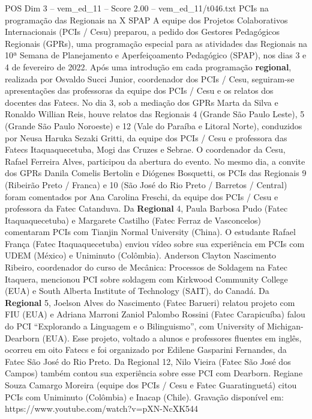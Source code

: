 \begin{textsample}{POS Dim 3 – vem\_ed\_11 – Score 2.00 – vem\_ed\_11/t046.txt}  \label{ex:f3_pos_141}
PCIs na programação das Regionais na X SPAP A equipe dos Projetos Colaborativos Internacionais (PCIs / Cesu) preparou, a pedido dos Gestores Pedagógicos Regionais (GPRs), uma programação especial para as atividades das Regionais na 10ª Semana de Planejamento e Aperfeiçoamento Pedagógico (SPAP), nos dias 3 e 4 de fevereiro de 2022.
Após uma introdução em cada programação \textbf{regional}, realizada por Osvaldo Succi Junior, coordenador dos PCIs / Cesu, seguiram-se apresentações das professoras da equipe dos PCIs / Cesu e os relatos dos docentes das Fatecs.
No dia 3, sob a mediação dos GPRs Marta da Silva e Ronaldo Willian Reis, houve relatos das Regionais 4 (Grande São Paulo Leste), 5 (Grande São Paulo Noroeste) e 12 (Vale do Paraíba e Litoral Norte), conduzidos por Neusa Haruka Sezaki Gritti, da equipe dos PCIs / Cesu e professora das Fatecs Itaquaquecetuba, Mogi das Cruzes e Sebrae.
O coordenador da Cesu, Rafael Ferreira Alves, participou da abertura do evento.
No mesmo dia, a convite dos GPRs Danila Comelis Bertolin e Diógenes Bosquetti, os PCIs das Regionais 9 (Ribeirão Preto / Franca) e 10 (São José do Rio Preto / Barretos / Central) foram comentados por Ana Carolina Freschi, da equipe dos PCIs / Cesu e professora da Fatec Catanduva.
Da \textbf{Regional} 4, Paula Barbosa Pudo (Fatec Itaquaquecetuba) e Margarete Castilho (Fatec Ferraz de Vasconcelos) comentaram PCIs com Tianjin Normal University (China).
O estudante Rafael França (Fatec Itaquaquecetuba) enviou vídeo sobre sua experiência em PCIs com UDEM (México) e Uniminuto (Colômbia).
Anderson Clayton Nascimento Ribeiro, coordenador do curso de Mecânica: Processos de Soldagem na Fatec Itaquera, mencionou PCI sobre soldagem com Kirkwood Community College (EUA) e South Alberta Institute of Technology (SAIT), do Canadá.
Da \textbf{Regional} 5, Joelson Alves do Nascimento (Fatec Barueri) relatou projeto com FIU (EUA) e Adriana Marroni Zaniol Palombo Rossini (Fatec Carapicuíba) falou do PCI “Explorando a Linguagem e o Bilinguismo”, com University of Michigan-Dearborn (EUA).
Esse projeto, voltado a alunos e professores fluentes em inglês, ocorreu em oito Fatecs e foi organizado por Edilene Gasparini Fernandes, da Fatec São José do Rio Preto.
Da Regional 12, Nilo Vieira (Fatec São José dos Campos) também contou sua experiência sobre esse PCI com Dearborn.
Regiane Souza Camargo Moreira (equipe dos PCIs / Cesu e Fatec Guaratinguetá) citou PCIs com Uniminuto (Colômbia) e Inacap (Chile).
Gravação disponível em: https://www.youtube.com/watch?v=pXN-NcXK544

\end{textsample}
